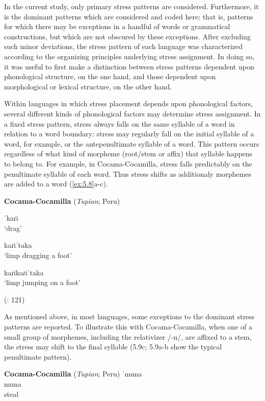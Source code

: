   In the current study, only primary stress patterns are considered. Furthermore, it is the dominant patterns which are considered and coded here; that is, patterns for which there may be exceptions in a handful of words or grammatical constructions, but which are not obscured by these exceptions. After excluding such minor deviations, the stress pattern of each language was characterized according to the organizing principles underlying stress assignment. In doing so, it was useful to first make a distinction between stress patterns dependent upon phonological structure, on the one hand, and those dependent upon morphological or lexical structure, on the other hand.

   Within languages in which stress placement depends upon phonological factors, several different kinds of phonological factors may determine stress assignment. In a fixed stress pattern, stress always falls on the same syllable of a word in relation to a word boundary: stress may regularly fall on the initial syllable of a word, for example, or the antepenultimate syllable of a word. This pattern occurs regardless of what kind of morpheme (root/stem or affix) that syllable happens to belong to. For example, in Cocama-Cocamilla, stress falls predictably on the penultimate syllable of each word. Thus stress shifts as additionaly morphemes are added to a word (\ref{ex:5.8}a-c).

\ea\label{ex:5.8}
  \textbf{Cocama-Cocamilla} (\textit{Tupian}; Peru)

\ea   ˈkaɾi\\
\glt ‘drag’

\ex   kaɾiˈtaka\\
\glt ‘limp dragging a foot’

\ex   kaɾikaɾiˈtaka\\
\glt ‘limp jumping on a foot’

(\citealt{VallejosYopán2010}: 121)
\z
\z

  As mentioned above, in most languages, some exceptions to the dominant stress patterns are reported. To illustrate this with Cocama-Cocamilla, when one of a small group of morphemes, including the relativizer /-n/, are affixed to a stem, the stress may shift to the final syllable (5.9c; 5.9a-b show the typical penultimate pattern).

\ea\label{ex:5.9}
  \textbf{Cocama-Cocamilla} (\textit{Tupian}; Peru)
\ea   ˈmuna\\
  muna\\
steal

